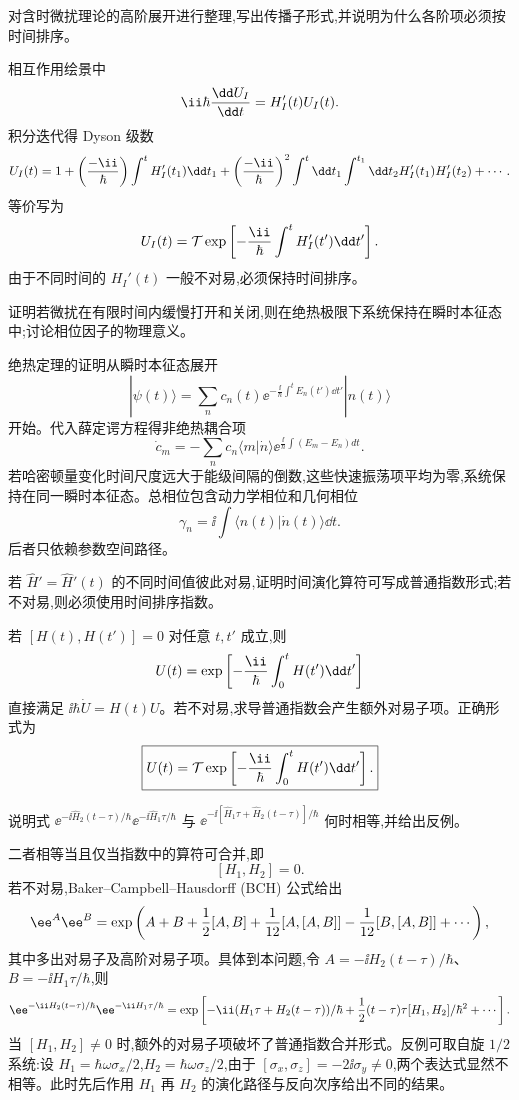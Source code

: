 \begin{question}
对含时微扰理论的高阶展开进行整理,写出传播子形式,并说明为什么各阶项必须按时间排序。
\begin{solution}
相互作用绘景中
\[
\ii\hbar {\dd U_I\over\dd t}=H_I'(t)U_I(t).
\]
积分迭代得 Dyson 级数
\[
U_I(t)=1+\left({-\ii\over\hbar}\right)\int^t H_I'(t_1)\dd t_1
+\left({-\ii\over\hbar}\right)^2\int^t\dd t_1\int^{t_1}\dd t_2 H_I'(t_1)H_I'(t_2)+\cdots.
\]
等价写为
\[
U_I(t)=\mathcal T\exp\left[-{\ii\over\hbar}\int^t H_I'(t')\dd t'\right].
\]
由于不同时间的 $H_I'(t)$ 一般不对易,必须保持时间排序。
\end{solution}
\end{question}

\begin{question}
证明若微扰在有限时间内缓慢打开和关闭,则在绝热极限下系统保持在瞬时本征态中;讨论相位因子的物理意义。
\begin{solution}
绝热定理的证明从瞬时本征态展开
\[
|\psi(t)\rangle=\sum_n c_n(t)\ee^{-\frac{\ii}{\hbar}\int^t E_n(t')\dd t'}|n(t)\rangle
\]
开始。代入薛定谔方程得非绝热耦合项
\[
\dot c_m=-\sum_n c_n\langle m|\dot n\rangle \ee^{\frac{\ii}{\hbar}\int(E_m-E_n)dt}.
\]
若哈密顿量变化时间尺度远大于能级间隔的倒数,这些快速振荡项平均为零,系统保持在同一瞬时本征态。总相位包含动力学相位和几何相位
\[
\gamma_n=\ii\int\langle n(t)|\dot n(t)\rangle\dd t.
\]
后者只依赖参数空间路径。
\end{solution}
\end{question}

\begin{question}
若 $\hat H'=\hat H'(t)$ 的不同时间值彼此对易,证明时间演化算符可写成普通指数形式;若不对易,则必须使用时间排序指数。
\begin{solution}
若 $[H(t),H(t')]=0$ 对任意 $t,t'$ 成立,则
\[
U(t)=\exp\left[-{\ii\over\hbar}\int_0^t H(t')\dd t'\right]
\]
直接满足 $\ii\hbar\dot U=H(t)U$。若不对易,求导普通指数会产生额外对易子项。正确形式为
\[
\boxed{U(t)=\mathcal T\exp\left[-{\ii\over\hbar}\int_0^t H(t')\dd t'\right].}
\]
\end{solution}
\end{question}

\begin{question}
说明式 $\ee^{-\ii\hat H_2(t-\tau)/\hbar}\ee^{-\ii\hat H_1\tau/\hbar}$ 与 $\ee^{-\ii[\hat H_1\tau+\hat H_2(t-\tau)]/\hbar}$ 何时相等,并给出反例。
\begin{solution}
二者相等当且仅当指数中的算符可合并,即
\[
[H_1,H_2]=0.
\]
若不对易,Baker--Campbell--Hausdorff (BCH) 公式给出
\[
\ee^A\ee^B=\exp\left(A+B+{1\over2}[A,B]+{1\over12}[A,[A,B]]-{1\over12}[B,[A,B]]+\cdots\right),
\]
其中多出对易子及高阶对易子项。具体到本问题,令 $A=-\ii H_2(t-\tau)/\hbar$、$B=-\ii H_1\tau/\hbar$,则
\[
\ee^{-\ii H_2(t-\tau)/\hbar}\ee^{-\ii H_1\tau/\hbar}
=\exp\left[-\ii(H_1\tau+H_2(t-\tau))/\hbar
+{1\over2}(t-\tau)\tau[H_1,H_2]/\hbar^2+\cdots\right].
\]
当 $[H_1,H_2]\neq0$ 时,额外的对易子项破坏了普通指数合并形式。反例可取自旋 $1/2$ 系统:设 $H_1=\hbar\omega\sigma_x/2$,$H_2=\hbar\omega\sigma_z/2$,由于 $[\sigma_x,\sigma_z]=-2\ii\sigma_y\neq0$,两个表达式显然不相等。此时先后作用 $H_1$ 再 $H_2$ 的演化路径与反向次序给出不同的结果。
\end{solution}
\end{question}

